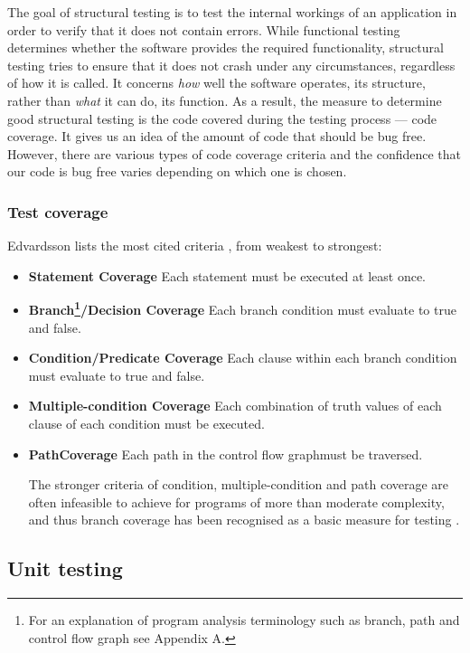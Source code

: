 \documentclass[a4paper,11pt,titlepage]{report}
\begin{document}
The goal of structural testing is to test the internal workings \cite{mcminn2004search} of an application in order to verify that it does not contain errors. While functional testing determines whether the software provides the required functionality, structural testing tries to ensure that it does not crash under any circumstances, regardless of how it is called. It concerns \emph{how} well the software operates, its structure, rather than \emph{what} it can do, its function. As a result, the measure to determine good structural testing is the code covered during the testing process --- code coverage. It gives us an idea of the amount of code that should be bug free. However, there are various types of code coverage criteria and the confidence that our code is bug free varies depending on which one is chosen.

\subsubsection{Test coverage}
Edvardsson lists the most cited criteria \cite{edvardsson1999survey}, from weakest to strongest:
\begin{itemize}
	\item \textbf{Statement Coverage} Each statement must be executed at least once.
 	\item \textbf{Branch\footnote{For an explanation of program analysis terminology such as branch, path and control flow graph see Appendix A.}/Decision Coverage} Each branch condition must evaluate to true and false.
 	\item \textbf{Condition/Predicate Coverage} Each clause within each branch condition must evaluate to true and false.
 	\item \textbf{Multiple-condition Coverage} Each combination of truth values of each clause of each condition must be executed.
 	\item \textbf{Path\footnotemark[\value{footnote}] Coverage} Each path in the control flow graph\footnotemark[\value{footnote}] must be traversed.

The stronger criteria of condition, multiple-condition and path coverage are often infeasible to achieve for programs of more than moderate complexity, and thus branch coverage has been recognised as a basic measure for testing \cite{edvardsson1999survey}.
\end{itemize}

\subsection{Unit testing}
\end{document}
